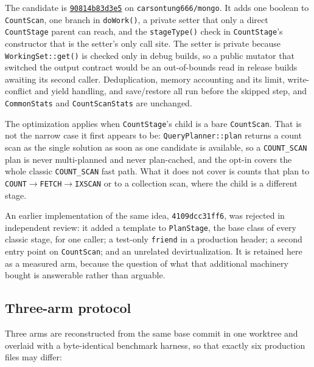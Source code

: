 \documentclass[10pt]{article}
\newcommand{\code}[1]{\texttt{#1}}
\begin{document}
The candidate is
\href{https://github.com/carsontung666/mongo/commit/90814b83d3e55f099c1244266d86700b5f633972}{\code{90814b83d3e5}}
on \code{carsontung666/mongo}. It adds one boolean to \code{CountScan}, one
branch in \code{doWork()}, a private setter that only a direct \code{CountStage}
parent can reach, and the \code{stageType()} check in \code{CountStage}'s
constructor that is the setter's only call site. The setter is private because
\code{WorkingSet::get()} is checked only in debug builds, so a public mutator
that switched the output contract would be an out-of-bounds read in release
builds awaiting its second caller. Deduplication, memory accounting and its
limit, write-conflict and yield handling, and save/restore all run before the
skipped step, and \code{CommonStats} and \code{CountScanStats} are unchanged.

The optimization applies when \code{CountStage}'s child is a bare
\code{CountScan}. That is not the narrow case it first appears to be:
\code{QueryPlanner::plan} returns a count scan as the single solution as soon as
one candidate is available, so a \code{COUNT\_SCAN} plan is never multi-planned
and never plan-cached, and the opt-in covers the whole classic
\code{COUNT\_SCAN} fast path. What it does not cover is counts that plan to
\code{COUNT}$\rightarrow$\code{FETCH}$\rightarrow$\code{IXSCAN} or to a
collection scan, where the child is a different stage.

An earlier implementation of the same idea, \code{4109dcc31ff6}, was rejected in
independent review: it added a template to \code{PlanStage}, the base class of
every classic stage, for one caller; a test-only \code{friend} in a production
header; a second entry point on \code{CountScan}; and an unrelated
devirtualization. It is retained here as a measured arm, because the question
of what that additional machinery bought is answerable rather than arguable.

\subsection{Three-arm protocol}

Three arms are reconstructed from the same base commit in one worktree and
overlaid with a byte-identical benchmark harness, so that exactly six production
files may differ:
\end{document}
